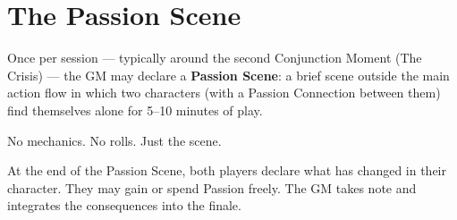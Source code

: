 \secsep

\section{The Passion Scene}

Once per session --- typically around the second Conjunction Moment
(The Crisis) --- the GM may declare a \textbf{Passion Scene}: a brief
scene outside the main action flow in which two characters (with a
Passion Connection between them) find themselves alone for 5--10 minutes
of play.

No mechanics. No rolls. Just the scene.

At the end of the Passion Scene, both players declare what has changed
in their character. They may gain or spend Passion freely. The GM takes
note and integrates the consequences into the finale.


\filettodoppio
